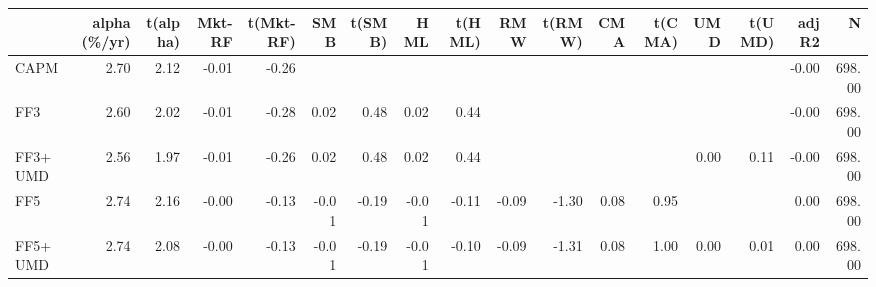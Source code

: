 \begin{tabular}{lrrrrrrrrrrrrrrrr}
\toprule
 & alpha (\%/yr) & t(alpha) & Mkt-RF & t(Mkt-RF) & SMB & t(SMB) & HML & t(HML) & RMW & t(RMW) & CMA & t(CMA) & UMD & t(UMD) & adj R2 & N \\
\midrule
CAPM & 2.70 & 2.12 & -0.01 & -0.26 &  &  &  &  &  &  &  &  &  &  & -0.00 & 698.00 \\
FF3 & 2.60 & 2.02 & -0.01 & -0.28 & 0.02 & 0.48 & 0.02 & 0.44 &  &  &  &  &  &  & -0.00 & 698.00 \\
FF3+UMD & 2.56 & 1.97 & -0.01 & -0.26 & 0.02 & 0.48 & 0.02 & 0.44 &  &  &  &  & 0.00 & 0.11 & -0.00 & 698.00 \\
FF5 & 2.74 & 2.16 & -0.00 & -0.13 & -0.01 & -0.19 & -0.01 & -0.11 & -0.09 & -1.30 & 0.08 & 0.95 &  &  & 0.00 & 698.00 \\
FF5+UMD & 2.74 & 2.08 & -0.00 & -0.13 & -0.01 & -0.19 & -0.01 & -0.10 & -0.09 & -1.31 & 0.08 & 1.00 & 0.00 & 0.01 & 0.00 & 698.00 \\
\bottomrule
\end{tabular}
